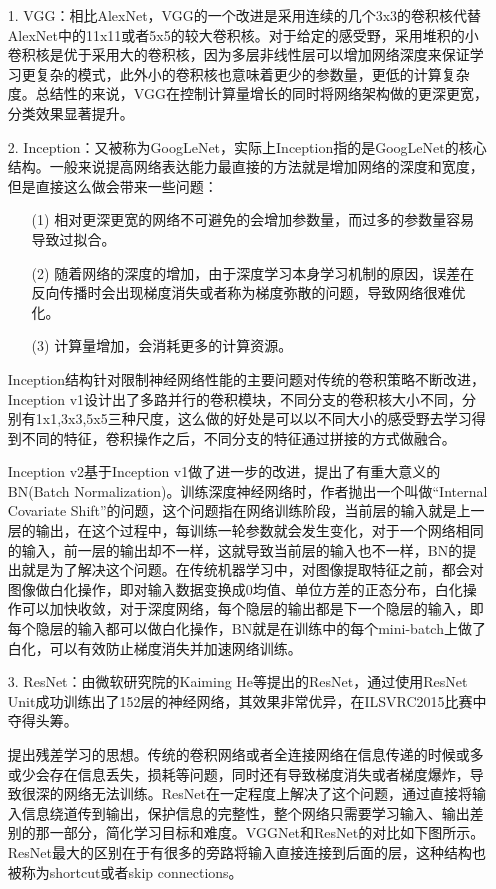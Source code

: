 \begin{itemize}
  \item [1.]VGG：相比AlexNet，VGG的一个改进是采用连续的几个3x3的卷积核代替AlexNet中的11x11或者5x5的较大卷积核。对于给定的感受野，采用堆积的小卷积核是优于采用大的卷积核，因为多层非线性层可以增加网络深度来保证学习更复杂的模式，此外小的卷积核也意味着更少的参数量，更低的计算复杂度。总结性的来说，VGG在控制计算量增长的同时将网络架构做的更深更宽，分类效果显著提升。
\item [2.]Inception：又被称为GoogLeNet，实际上Inception指的是GoogLeNet的核心结构。一般来说提高网络表达能力最直接的方法就是增加网络的深度和宽度，但是直接这么做会带来一些问题：
\begin{itemize}
  \item [(1)]相对更深更宽的网络不可避免的会增加参数量，而过多的参数量容易导致过拟合。
  \item [(2)] 随着网络的深度的增加，由于深度学习本身学习机制的原因，误差在反向传播时会出现梯度消失或者称为梯度弥散的问题，导致网络很难优化。
  \item [(3)] 计算量增加，会消耗更多的计算资源。
\end{itemize}

Inception结构针对限制神经网络性能的主要问题对传统的卷积策略不断改进，Inception v1设计出了多路并行的卷积模块，不同分支的卷积核大小不同，分别有1x1,3x3,5x5三种尺度，这么做的好处是可以以不同大小的感受野去学习得到不同的特征，卷积操作之后，不同分支的特征通过拼接的方式做融合。

Inception v2\cite{ioffe2015batch}基于Inception v1做了进一步的改进，提出了有重大意义的BN(Batch Normalization)。训练深度神经网络时，作者抛出一个叫做“Internal Covariate Shift”的问题，这个问题指在网络训练阶段，当前层的输入就是上一层的输出，在这个过程中，每训练一轮参数就会发生变化，对于一个网络相同的输入，前一层的输出却不一样，这就导致当前层的输入也不一样，BN的提出就是为了解决这个问题。在传统机器学习中，对图像提取特征之前，都会对图像做白化操作，即对输入数据变换成0均值、单位方差的正态分布，白化操作可以加快收敛，对于深度网络，每个隐层的输出都是下一个隐层的输入，即每个隐层的输入都可以做白化操作，BN就是在训练中的每个mini-batch上做了白化，可以有效防止梯度消失并加速网络训练。

\item [3.]ResNet：由微软研究院的Kaiming He等提出的ResNet，通过使用ResNet Unit成功训练出了152层的神经网络，其效果非常优异，在ILSVRC2015比赛中夺得头筹。

提出残差学习的思想。传统的卷积网络或者全连接网络在信息传递的时候或多或少会存在信息丢失，损耗等问题，同时还有导致梯度消失或者梯度爆炸，导致很深的网络无法训练。ResNet在一定程度上解决了这个问题，通过直接将输入信息绕道传到输出，保护信息的完整性，整个网络只需要学习输入、输出差别的那一部分，简化学习目标和难度。VGGNet和ResNet的对比如下图所示。ResNet最大的区别在于有很多的旁路将输入直接连接到后面的层，这种结构也被称为shortcut或者skip connections。


\end{itemize}
